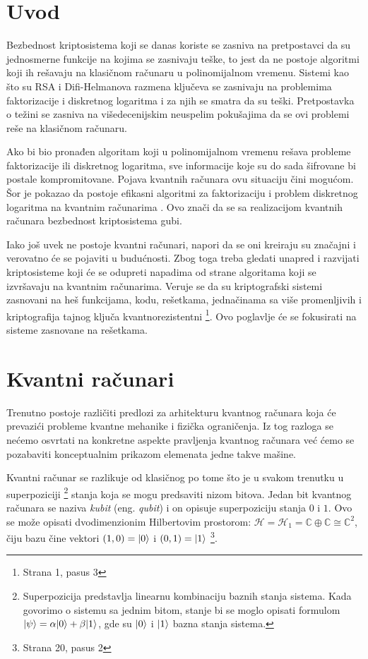 \section{Uvod}

Bezbednost kriptosistema koji se danas koriste se zasniva na pretpostavci da su jednosmerne funkcije na kojima se zasnivaju teške, to jest da ne postoje algoritmi koji ih rešavaju na klasičnom računaru u polinomijalnom vremenu. Sistemi kao što su RSA i Difi-Helmanova razmena ključeva se zasnivaju na problemima faktorizacije i diskretnog logaritma i za njih se smatra da su teški. Pretpostavka o težini se zasniva na višedecenijskim neuspelim pokušajima da se ovi problemi reše na klasičnom računaru. 

Ako bi bio pronađen algoritam koji u polinomijalnom vremenu rešava probleme faktorizacije ili diskretnog logaritma, sve informacije koje su do sada šifrovane bi postale kompromitovane. Pojava kvantnih računara ovu situaciju čini mogućom. Šor je pokazao da postoje efikasni algoritmi za faktorizaciju i problem diskretnog logaritma na kvantnim računarima \cite{Shor_1997}. Ovo znači da se sa realizacijom kvantnih računara bezbednost kriptosistema gubi. 

Iako još uvek ne postoje kvantni računari, napori da se oni kreiraju su značajni i verovatno će se pojaviti u budućnosti. Zbog toga treba gledati unapred i razvijati kriptosisteme koji će se odupreti napadima od strane algoritama koji se izvršavaju na kvantnim računarima. Veruje se da su kriptografski sistemi zasnovani na heš funkcijama, kodu, rešetkama, jednačinama sa više promenljivih i kriptografija tajnog ključa kvantnorezistentni \cite{postquantumcryptography:2009} \footnote{Strana 1, pasus 3}. Ovo poglavlje će se fokusirati na sisteme zasnovane na rešetkama.

\section{Kvantni računari}

Trenutno postoje različiti predlozi za arhitekturu kvantnog računara koja će prevazići probleme kvantne mehanike i fizička ograničenja. Iz tog razloga se nećemo osvrtati na konkretne aspekte pravljenja kvantnog računara već ćemo se pozabaviti konceptualnim prikazom elemenata jedne takve mašine. 

Kvantni računar se razlikuje od klasičnog po tome što je u svakom trenutku u superpoziciji \footnote{Superpozicija predstavlja linearnu kombinaciju baznih stanja sistema. Kada govorimo o sistemu sa jednim bitom, stanje bi se moglo opisati formulom $ | \psi \rangle = \alpha | 0 \rangle + \beta | 1 \rangle$, gde su $| 0 \rangle$ i $| 1 \rangle$ bazna stanja sistema.} stanja koja se mogu predsaviti nizom bitova. Jedan bit kvantnog računara se naziva \textit{kubit} (eng. \textit{qubit}) i on opisuje superpoziciju stanja $0$ i $1$. Ovo se može opisati dvodimenzionim Hilbertovim prostorom: $\mathcal{H} = \mathcal{H}_1 = \mathbb{C} \oplus \mathbb{C} \cong \mathbb{C}^2 $, čiju bazu čine vektori $(1, 0) = | 0 \rangle$ i $(0,1) = | 1 \rangle$ \cite{postquantumcryptography:2009} \footnote{Strana 20, pasus 2}.

